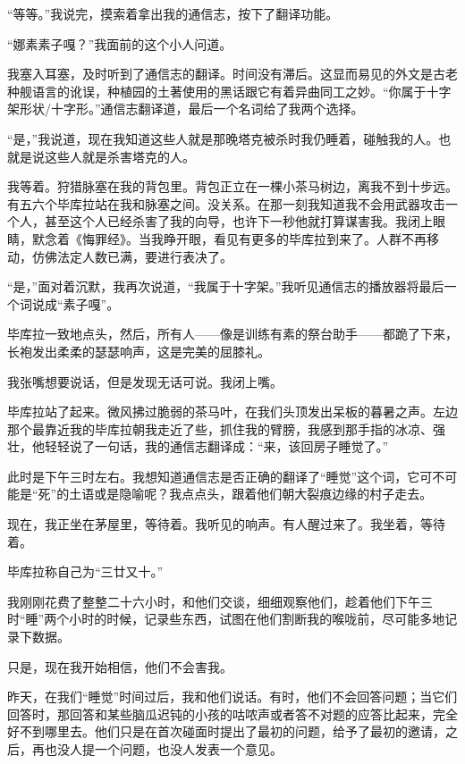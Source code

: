 \documentclass[AutoFakeBold=true]{book}
\begin{document}
``等等。''我说完，摸索着拿出我的通信志，按下了翻译功能。

``娜素素子嘎？''我面前的这个小人问道。

我塞入耳塞，及时听到了通信志的翻译。时间没有滞后。这显而易见的外文是古老种舰语言的讹误，种植园的土著使用的黑话跟它有着异曲同工之妙。``你属于十字架形状/十字形。''通信志翻译道，最后一个名词给了我两个选择。

``是，''我说道，现在我知道这些人就是那晚塔克被杀时我仍睡着，碰触我的人。也就是说这些人就是杀害塔克的人。

我等着。狩猎脉塞在我的背包里。背包正立在一棵小茶马树边，离我不到十步远。有五六个毕库拉站在我和脉塞之间。没关系。在那一刻我知道我不会用武器攻击一个人，甚至这个人已经杀害了我的向导，也许下一秒他就打算谋害我。我闭上眼睛，默念着《悔罪经》。当我睁开眼，看见有更多的毕库拉到来了。人群不再移动，仿佛法定人数已满，要进行表决了。

``是，''面对着沉默，我再次说道，``我属于十字架。''我听见通信志的播放器将最后一个词说成``素子嘎''。

毕库拉一致地点头，然后，所有人——像是训练有素的祭台助手——都跪了下来，长袍发出柔柔的瑟瑟响声，这是完美的屈膝礼。

我张嘴想要说话，但是发现无话可说。我闭上嘴。

毕库拉站了起来。微风拂过脆弱的茶马叶，在我们头顶发出呆板的暮暑之声。左边那个最靠近我的毕库拉朝我走近了些，抓住我的臂膀，我感到那手指的冰凉、强壮，他轻轻说了一句话，我的通信志翻译成：``来，该回房子睡觉了。''

此时是下午三时左右。我想知道通信志是否正确的翻译了``睡觉''这个词，它可不可能是``死''的土语或是隐喻呢？我点点头，跟着他们朝大裂痕边缘的村子走去。

现在，我正坐在茅屋里，等待着。我听见的响声。有人醒过来了。我坐着，等待着。

\vspace*{1em}{\kaishu 第九十七日：}

毕库拉称自己为``三廿又十。''

我刚刚花费了整整二十六小时，和他们交谈，细细观察他们，趁着他们下午三时``睡''两个小时的时候，记录些东西，试图在他们割断我的喉咙前，尽可能多地记录下数据。

只是，现在我开始相信，他们不会害我。

昨天，在我们``睡觉''时间过后，我和他们说话。有时，他们不会回答问题；当它们回答时，那回答和某些脑瓜迟钝的小孩的咕哝声或者答不对题的应答比起来，完全好不到哪里去。他们只是在首次碰面时提出了最初的问题，给予了最初的邀请，之后，再也没人提一个问题，也没人发表一个意见。
\end{document}
